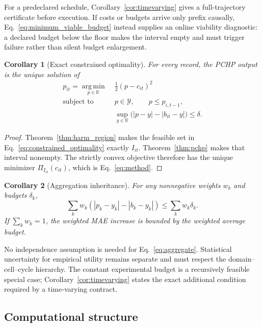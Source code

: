 \documentclass[11pt]{article}
\newtheorem{corollary}{Corollary}
\newcommand{\R}{\mathbb{R}}
\begin{document}
For a predeclared schedule, Corollary~\ref{cor:timevarying} gives a full-trajectory certificate before execution. If costs or budgets arrive only prefix causally, Eq.~\eqref{eq:minimum_viable_budget} instead supplies an online viability diagnostic: a declared budget below the floor makes the interval empty and must trigger failure rather than silent budget enlargement.

\begin{corollary}[Exact constrained optimality]
\label{cor:optimality}
For every record, the PCHP output is the unique solution of
\begin{equation}
\begin{aligned}
  p_{it}=\operatorname*{arg\,min}_{p\in\R}\;&\frac{1}{2}(p-c_{it})^2\\
  \text{subject to}\quad
  &p\in\mathcal Y,\qquad p\leq p_{i,t-1},\\
  &\sup_{y\in\R}\bigl(|p-y|-|b_{it}-y|\bigr)\leq\delta.
\end{aligned}
\label{eq:constrained_optimality}
\end{equation}
\end{corollary}
\begin{proof}
Theorem~\ref{thm:harm_region} makes the feasible set in Eq.~\eqref{eq:constrained_optimality} exactly $I_{it}$. Theorem~\ref{thm:pchp} makes that interval nonempty. The strictly convex objective therefore has the unique minimizer $\Pi_{I_{it}}(c_{it})$, which is Eq.~\eqref{eq:method}.
\end{proof}

\begin{corollary}[Aggregation inheritance]
For any nonnegative weights $w_k$ and budgets $\delta_k$,
\begin{equation}
  \sum_k w_k\left(|p_k-y_k|-|b_k-y_k|\right)
  \leq \sum_k w_k\delta_k.
  \label{eq:aggregate}
\end{equation}
If $\sum_k w_k=1$, the weighted MAE increase is bounded by the weighted average budget.
\end{corollary}

No independence assumption is needed for Eq.~\eqref{eq:aggregate}. Statistical uncertainty for empirical utility remains separate and must respect the domain--cell--cycle hierarchy. The constant experimental budget is a recursively feasible special case; Corollary~\ref{cor:timevarying} states the exact additional condition required by a time-varying contract.

\subsection{Computational structure}
\end{document}
